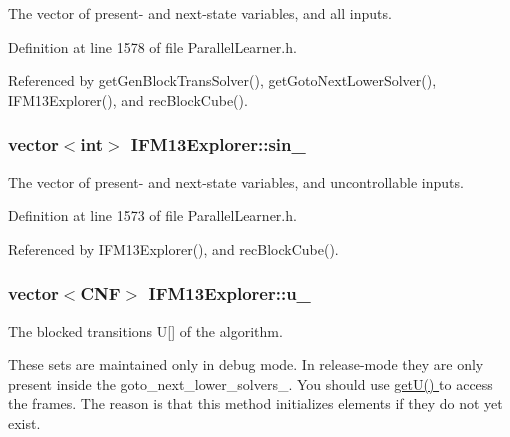 The vector of present-\/ and next-\/state variables, and all inputs. 



Definition at line 1578 of file Parallel\-Learner.\-h.



Referenced by get\-Gen\-Block\-Trans\-Solver(), get\-Goto\-Next\-Lower\-Solver(), I\-F\-M13\-Explorer(), and rec\-Block\-Cube().

\hypertarget{classIFM13Explorer_a972f36d23d8990dde764f4ee877620fa}{
\subsubsection[{sin\-\_\-}]{\setlength{\rightskip}{0pt plus 5cm}vector$<$int$>$ I\-F\-M13\-Explorer\-::sin\-\_\-\hspace{0.3cm}{\ttfamily [protected]}}}\label{classIFM13Explorer_a972f36d23d8990dde764f4ee877620fa}


The vector of present-\/ and next-\/state variables, and uncontrollable inputs. 



Definition at line 1573 of file Parallel\-Learner.\-h.



Referenced by I\-F\-M13\-Explorer(), and rec\-Block\-Cube().

\hypertarget{classIFM13Explorer_a1f8ea34a97c568894a23a7361339f9ec}{
\subsubsection[{u\-\_\-}]{\setlength{\rightskip}{0pt plus 5cm}vector$<${\bf C\-N\-F}$>$ I\-F\-M13\-Explorer\-::u\-\_\-\hspace{0.3cm}{\ttfamily [protected]}}}\label{classIFM13Explorer_a1f8ea34a97c568894a23a7361339f9ec}


The blocked transitions U\mbox{[}\mbox{]} of the algorithm. 

These sets are maintained only in debug mode. In release-\/mode they are only present inside the goto\-\_\-next\-\_\-lower\-\_\-solvers\-\_\-. You should use \hyperlink{classIFM13Explorer_a2816b4c9f2cb02958e660a872f43fe4b}{get\-U() } to access the frames. The reason is that this method initializes elements if they do not yet exist. 

